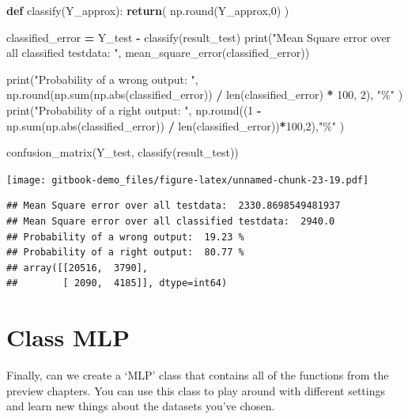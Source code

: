 \documentclass[
]{book}
\newenvironment{Shaded}{\begin{snugshade}}{\end{snugshade}}
\newcommand{\BuiltInTok}[1]{#1}
\newcommand{\ControlFlowTok}[1]{\textcolor[rgb]{0.13,0.29,0.53}{\textbf{#1}}}
\newcommand{\DecValTok}[1]{\textcolor[rgb]{0.00,0.00,0.81}{#1}}
\newcommand{\KeywordTok}[1]{\textcolor[rgb]{0.13,0.29,0.53}{\textbf{#1}}}
\newcommand{\NormalTok}[1]{#1}
\newcommand{\OperatorTok}[1]{\textcolor[rgb]{0.81,0.36,0.00}{\textbf{#1}}}
\newcommand{\StringTok}[1]{\textcolor[rgb]{0.31,0.60,0.02}{#1}}
\begin{document}
\begin{Shaded}
\begin{Highlighting}[]
\KeywordTok{def}\NormalTok{ classify(Y\_approx):}
  \ControlFlowTok{return}\NormalTok{( np.}\BuiltInTok{round}\NormalTok{(Y\_approx,}\DecValTok{0}\NormalTok{) )}

\NormalTok{classified\_error }\OperatorTok{=}\NormalTok{ Y\_test }\OperatorTok{{-}}\NormalTok{ classify(result\_test)}
\BuiltInTok{print}\NormalTok{(}\StringTok{"Mean Square error over all classified testdata: "}\NormalTok{, mean\_square\_error(classified\_error))}

\BuiltInTok{print}\NormalTok{(}\StringTok{"Probability of a wrong output: "}\NormalTok{, np.}\BuiltInTok{round}\NormalTok{(np.}\BuiltInTok{sum}\NormalTok{(np.}\BuiltInTok{abs}\NormalTok{(classified\_error)) }\OperatorTok{/} \BuiltInTok{len}\NormalTok{(classified\_error) }\OperatorTok{*} \DecValTok{100}\NormalTok{, }\DecValTok{2}\NormalTok{), }\StringTok{"\%"}\NormalTok{ )}
\BuiltInTok{print}\NormalTok{(}\StringTok{"Probability of a right output: "}\NormalTok{, np.}\BuiltInTok{round}\NormalTok{((}\DecValTok{1} \OperatorTok{{-}}\NormalTok{ np.}\BuiltInTok{sum}\NormalTok{(np.}\BuiltInTok{abs}\NormalTok{(classified\_error)) }\OperatorTok{/} \BuiltInTok{len}\NormalTok{(classified\_error))}\OperatorTok{*}\DecValTok{100}\NormalTok{,}\DecValTok{2}\NormalTok{),}\StringTok{"\%"}\NormalTok{ )}


\NormalTok{confusion\_matrix(Y\_test, classify(result\_test))}
\end{Highlighting}
\end{Shaded}

\texttt{[image: gitbook-demo\_files/figure-latex/unnamed-chunk-23-19.pdf]}

\begin{verbatim}
## Mean Square error over all testdata:  2330.8698549481937
## Mean Square error over all classified testdata:  2940.0
## Probability of a wrong output:  19.23 %
## Probability of a right output:  80.77 %
## array([[20516,  3790],
##        [ 2090,  4185]], dtype=int64)
\end{verbatim}

\hypertarget{class-mlp}{%
\chapter{Class MLP}\label{class-mlp}}

Finally, can we create a `MLP' class that contains all of the functions from the preview chapters. You can use this class to play around with different settings and learn new things about the datasets you've chosen.
\end{document}
